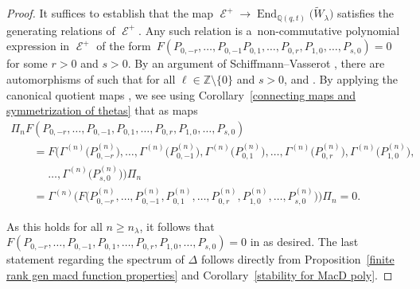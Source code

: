 \documentclass[10pt,a4paper]{amsart}
\numberwithin{equation}{section}
\theoremstyle{definition}
\DeclareMathOperator{\sD}{\mathscr{D}}
\DeclareMathOperator{\sE}{\mathcal{E}}
\DeclareMathOperator{\End}{\mathrm{End}}
\begin{document}
\begin{proof}
It suffices to establish that the map $\sE^{+} \rightarrow \End_{\mathbb{Q}(q,t)}\bigl(\widetilde{W}_{\lambda}\bigr)$ satisfies the generating relations of $\sE^{+}$. Any such relation is a~non-commutative polynomial expression in $\sE^{+}$ of the form~${ F(P_{0,-r},\dots, P_{0,-1}P_{0,1},\dots,P_{0,r},P_{1,0},\dots,P_{s,0}) = 0}
$
for some $r > 0$ and $s>0$. By an argument of Schiffmann--Vasserot \cite[Lemma 1.3]{SV}, there are automorphisms  of \smash{$\sD_n^{\mathrm{sph}}$} such that for all $\ell \in \mathbb{Z}\setminus \{0\}$ and $s>0$,
 and . By applying the canonical quotient maps , we see using Corollary~\ref{connecting maps and symmetrization of thetas} that as maps
\begin{gather*}
\Pi_nF(P_{0,-r},\dots, P_{0,-1},P_{0,1},\dots,P_{0,r},P_{1,0},\dots,P_{s,0}) \\
\qquad=F\bigl(\Gamma^{(n)}\bigl(P^{(n)}_{0,-r}\bigr),\dots,\Gamma^{(n)}\bigl(P^{(n)}_{0,-1}\bigr),\Gamma^{(n)}\bigl(P^{(n)}_{0,1}\bigr), \dots, \Gamma^{(n)}\bigl(P^{(n)}_{0,r}\bigr),\Gamma^{(n)}\bigl(P^{(n)}_{1,0}\bigr),\\
\phantom{\qquad=}{}\dots,\Gamma^{(n)}\bigl(P^{(n)}_{s,0}\bigr)\bigr)\Pi_n \\
\qquad= \Gamma^{(n)}\bigl(F\bigl(P^{(n)}_{0,-r},\dots, P^{(n)}_{0,-1},P^{(n)}_{0,1},\dots,P^{(n)}_{0,r},P^{(n)}_{1,0},\dots,P^{(n)}_{s,0}\bigr)\bigr) \Pi_n = 0.
\end{gather*}

As this holds for all $n \geq n_{\lambda}$, it follows that $F(P_{0,-r},\dots, P_{0,-1},P_{0,1},\dots,P_{0,r},P_{1,0},\dots,P_{s,0}) = 0$ in \smash{$\End_{\mathbb{Q}(q,t)}\bigl(\widetilde{W}_{\lambda}\bigr)$} as desired. The last statement regarding the spectrum of $\Delta$ follows directly from Proposition~\ref{finite rank gen macd function properties} and Corollary~\ref{stability for MacD poly}.
\end{proof}
\end{document}
